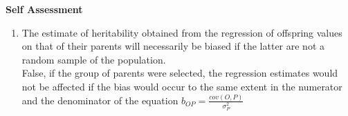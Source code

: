 \documentclass[12pt]{amsart}
\begin{document}
{\large \bf Self Assessment}
\begin{enumerate}
\item The estimate of heritability obtained from the regression of offspring values on that of their parents will necessarily be biased if the latter are not a random sample of the population.\\
False, if the group of parents were selected, the regression estimates would not be affected if the bias would occur to the same extent in the numerator and the denominator of the equation $b_{OP} = \frac{cov(O,P)}{\sigma^2_P}$\\
\end{enumerate}
\medskip
\end{document}
